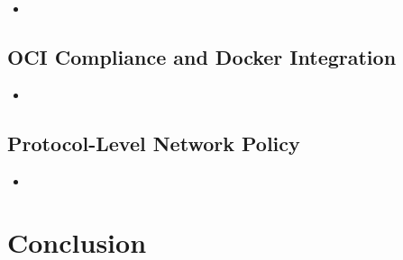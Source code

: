 \begin{inprogress}
  \begin{itemize}
    \item
  \end{itemize}
\end{inprogress}

\subsection{OCI Compliance and Docker Integration}

\begin{inprogress}
  \begin{itemize}
    \item
  \end{itemize}
\end{inprogress}

\subsection{Protocol-Level Network Policy}

\begin{inprogress}
  \begin{itemize}
    \item
  \end{itemize}
\end{inprogress}



\section{Conclusion}
\label{s:disc-conclusion}

